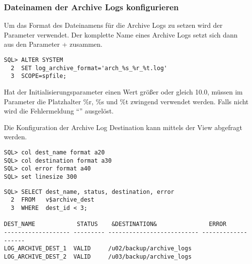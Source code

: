        \subsubsection{Dateinamen der Archive Logs konfigurieren}
          Um das Format des Dateinamens f\"ur die Archive Logs zu setzen wird der Parameter  verwendet. Der komplette Name eines Archive Logs setzt sich dann aus den Parameter  +  zusammen.
          \begin{lstlisting}[caption={\parameter{log\_archive\_format}-Parameter
          setzen},label=admin49,language=oracle_sql,alsolanguage=sqlplus]
SQL> ALTER SYSTEM
  2  SET log_archive_format='arch_%s_%r_%t.log'
  3  SCOPE=spfile;
          \end{lstlisting}
          \begin{merke}
            Hat der Initialisierungsparameter  einen Wert gr\"o\ss er oder gleich 10.0, m\"ussen im Parameter  die Platzhalter \%r, \%s und \%t zwingend verwendet werden. Falls nicht wird die Fehlermeldung \enquote{} ausgel\"ost.
          \end{merke}
          Die Konfiguration der Archive Log Destination kann mittels der View  abgefragt werden.
          \begin{lstlisting}[caption={Die Konfiguration der Archive Log Destination abfragen},label=admin50,language=sqlplus]
SQL> col dest_name format a20
SQL> col destination format a30
SQL> col error format a40
SQL> set linesize 300
					\end{lstlisting}
\clearpage
\begin{lstlisting}[caption={Die Konfiguration der Archive Log Destination abfragen - Fortsetzung},label=admin50a,language=oracle_sql]
SQL> SELECT dest_name, status, destination, error
  2  FROM   v$archive_dest
  3  WHERE  dest_id < 3;

DEST_NAME            STATUS    &DESTINATION&               ERROR
------------------- --------- -------------------------- -------------------
LOG_ARCHIVE_DEST_1  VALID     /u02/backup/archive_logs
LOG_ARCHIVE_DEST_2  VALID     /u03/backup/archive_logs
          \end{lstlisting}
